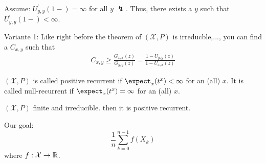 \documentclass[mfit.tex]{subfiles}
\begin{document}
Assume: $U_{y,y}^\prime(1-) = \infty$ for all $y$ $\lightning$.
Thus, there exists a $y$ such that $U_{y,y}^\prime(1-) < \infty$.

Variante 1: 
Like right before the theorem of $(\mathcal{X},P)$ is irreducble,..., you can find a $C_{x,y}$ such that
\begin{align*}
  C_{x,y} \geq \frac{G_{x,x}(z)}{G_{y,y}(z)} = \frac{1 - U_{y,y}(z)}{1 - U_{x,x}(z)}
\end{align*}

\begin{defi*}
  $(\mathcal{X},P)$ is called positive recurrent if $\expect_x(t^x) < \infty$ for an (all) $x$.
  It is called null-recurrent if $\expect_x(t^x) = \infty$ for an (all) $x$.
\end{defi*}

\begin{lemma}
  $(\mathcal{X},P)$ finite and irreducible. then it is positive recurrent.
\end{lemma}

Our goal: \[ \frac{1}{n} \sum_{k=0}^{n-1} f(X_k) \] where $f: \mathcal{X} \to \mathbb{R}$.
\end{document}
